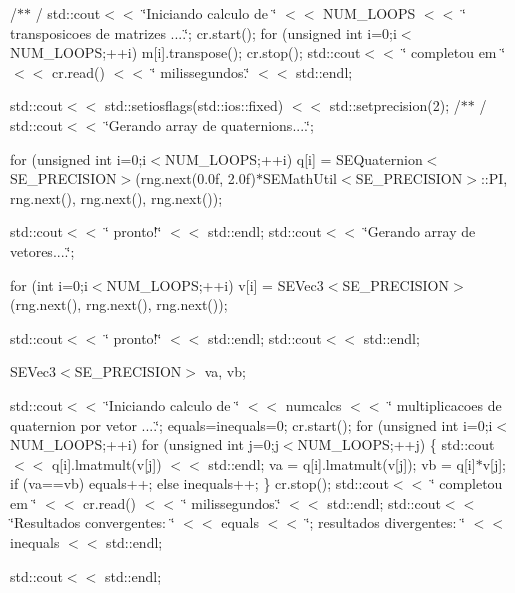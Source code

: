 /$\ast$$\ast$ / std\+::cout$<$$<$ \char`\"{}\+Iniciando calculo de \char`\"{} $<$$<$ N\+U\+M\+\_\+\+L\+O\+O\+P\+S $<$$<$ \char`\"{} transposicoes de matrizes ....\char`\"{}; cr.\+start(); for (unsigned int i=0;i$<$N\+U\+M\+\_\+\+L\+O\+O\+P\+S;++i) m[i].transpose(); cr.\+stop(); std\+::cout$<$$<$ \char`\"{} completou em \char`\"{} $<$$<$ cr.\+read() $<$$<$ \char`\"{} milissegundos.\char`\"{} $<$$<$ std\+::endl;

std\+::cout$<$$<$ std\+::setiosflags(std\+::ios\+::fixed) $<$$<$ std\+::setprecision(2); /$\ast$$\ast$ / std\+::cout$<$$<$ \char`\"{}\+Gerando array de quaternions....\char`\"{};

for (unsigned int i=0;i$<$N\+U\+M\+\_\+\+L\+O\+O\+P\+S;++i) q[i] = S\+E\+Quaternion$<$\+S\+E\+\_\+\+P\+R\+E\+C\+I\+S\+I\+O\+N$>$(rng.\+next(0.\+0f, 2.\+0f)$\ast$\+S\+E\+Math\+Util$<$\+S\+E\+\_\+\+P\+R\+E\+C\+I\+S\+I\+O\+N$>$\+::\+P\+I, rng.\+next(), rng.\+next(), rng.\+next());

std\+::cout$<$$<$ \char`\"{} pronto!\char`\"{} $<$$<$ std\+::endl; std\+::cout$<$$<$ \char`\"{}\+Gerando array de vetores....\char`\"{};

for (int i=0;i$<$N\+U\+M\+\_\+\+L\+O\+O\+P\+S;++i) v[i] = S\+E\+Vec3$<$\+S\+E\+\_\+\+P\+R\+E\+C\+I\+S\+I\+O\+N$>$(rng.\+next(), rng.\+next(), rng.\+next());

std\+::cout$<$$<$ \char`\"{} pronto!\char`\"{} $<$$<$ std\+::endl; std\+::cout$<$$<$ std\+::endl;

S\+E\+Vec3$<$\+S\+E\+\_\+\+P\+R\+E\+C\+I\+S\+I\+O\+N$>$ va, vb;

std\+::cout$<$$<$ \char`\"{}\+Iniciando calculo de \char`\"{} $<$$<$ numcalcs $<$$<$ \char`\"{} multiplicacoes de quaternion por vetor ....\char`\"{}; equals=inequals=0; cr.\+start(); for (unsigned int i=0;i$<$N\+U\+M\+\_\+\+L\+O\+O\+P\+S;++i) for (unsigned int j=0;j$<$N\+U\+M\+\_\+\+L\+O\+O\+P\+S;++j) \{ std\+::cout $<$$<$ q[i].lmatmult(v[j]) $<$$<$ std\+::endl; va = q[i].lmatmult(v[j]); vb = q[i]$\ast$v[j]; if (va==vb) equals++; else inequals++; \} cr.\+stop(); std\+::cout$<$$<$ \char`\"{} completou em \char`\"{} $<$$<$ cr.\+read() $<$$<$ \char`\"{} milissegundos.\char`\"{} $<$$<$ std\+::endl; std\+::cout$<$$<$ \char`\"{}\+Resultados convergentes\+: \char`\"{} $<$$<$ equals $<$$<$ \char`\"{}; resultados divergentes\+: \char`\"{} $<$$<$ inequals $<$$<$ std\+::endl;

std\+::cout$<$$<$ std\+::endl;

